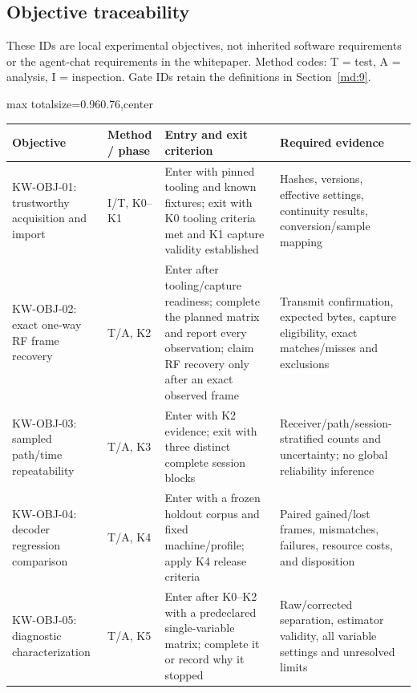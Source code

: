 \documentclass[11pt,a4paper]{article}
\newlength{\tableavail}
\renewcommand{\arraystretch}{1.13}
\begin{document}
\begin{landscape}\thispagestyle{plain}\centering
\section{Objective traceability}
\label{tp:objectives}
These IDs are local experimental objectives, not inherited software requirements or the agent-chat requirements in the whitepaper. Method codes: T = test, A = analysis, I = inspection. Gate IDs retain the definitions in Section~\ref{md:9}.


\setlength{\tabcolsep}{5pt}\renewcommand{\arraystretch}{1.25}
\setlength{\tableavail}{\dimexpr\linewidth-6\tabcolsep\relax}
\begin{adjustbox}{max totalsize={0.96\linewidth}{0.76\textheight},center}
\begin{tabular}{@{}>{\raggedright\arraybackslash}p{0.18\tableavail}>{\raggedright\arraybackslash}p{0.25\tableavail}>{\raggedright\arraybackslash}p{0.32\tableavail}>{\raggedright\arraybackslash}p{0.25\tableavail}@{}}
\toprule
\textbf{Objective} & \textbf{Method / phase} & \textbf{Entry and exit criterion} & \textbf{Required evidence}\\
\midrule
KW-OBJ-01: trustworthy acquisition and import & I/T, K0--K1 & Enter with pinned tooling and known fixtures; exit with K0 tooling criteria met and K1 capture validity established & Hashes, versions, effective settings, continuity results, conversion/sample mapping\\[5pt]
KW-OBJ-02: exact one-way RF frame recovery & T/A, K2 & Enter after tooling/capture readiness; complete the planned matrix and report every observation; claim RF recovery only after an exact observed frame & Transmit confirmation, expected bytes, capture eligibility, exact matches/misses and exclusions\\[5pt]
KW-OBJ-03: sampled path/time repeatability & T/A, K3 & Enter with K2 evidence; exit with three distinct complete session blocks & Receiver/path/session-stratified counts and uncertainty; no global reliability inference\\[5pt]
KW-OBJ-04: decoder regression comparison & T/A, K4 & Enter with a frozen holdout corpus and fixed machine/profile; apply K4 release criteria & Paired gained/lost frames, mismatches, failures, resource costs, and disposition\\[5pt]
KW-OBJ-05: diagnostic characterization & T/A, K5 & Enter after K0--K2 with a predeclared single-variable matrix; complete it or record why it stopped & Raw/corrected separation, estimator validity, all variable settings and unresolved limits\\[5pt]

\end{tabular}
\end{adjustbox}
\end{landscape}
\end{document}
